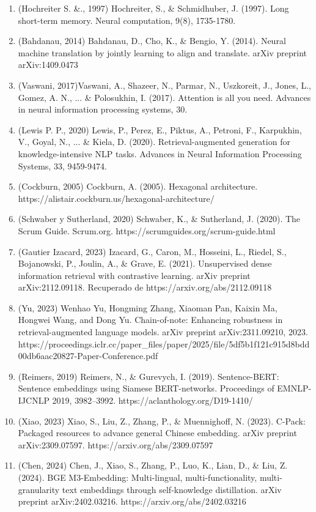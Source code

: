 \begin{enumerate}
\item (Hochreiter S. \&., 1997) Hochreiter, S., \& Schmidhuber, J. (1997). Long short-term memory. Neural computation, 9(8), 1735-1780.
\item (Bahdanau, 2014) Bahdanau, D., Cho, K., \& Bengio, Y. (2014). Neural machine translation by jointly learning to align and translate. arXiv preprint arXiv:1409.0473
\item (Vaswani, 2017)Vaswani, A., Shazeer, N., Parmar, N., Uszkoreit, J., Jones, L., Gomez, A. N., ... \& Polosukhin, I. (2017). Attention is all you need. Advances in neural information processing systems, 30.
\item (Lewis P. P., 2020) Lewis, P., Perez, E., Piktus, A., Petroni, F., Karpukhin, V., Goyal, N., ... \& Kiela, D. (2020). Retrieval-augmented generation for knowledge-intensive NLP tasks. Advances in Neural Information Processing Systems, 33, 9459-9474.
\item (Cockburn, 2005) Cockburn, A. (2005). Hexagonal architecture. https://alistair.cockburn.us/hexagonal-architecture/
\item (Schwaber y Sutherland, 2020) Schwaber, K., \& Sutherland, J. (2020). The Scrum Guide. Scrum.org. https://scrumguides.org/scrum-guide.html
\item (Gautier Izacard, 2023) Izacard, G., Caron, M., Hosseini, L., Riedel, S., Bojanowski, P., Joulin, A., \& Grave, E. (2021). Unsupervised dense information retrieval with contrastive learning. arXiv preprint arXiv:2112.09118. Recuperado de https://arxiv.org/abs/2112.09118
\item (Yu, 2023) Wenhao Yu, Hongming Zhang, Xiaoman Pan, Kaixin Ma, Hongwei Wang, and Dong Yu. Chain-of-note: Enhancing robustness in retrieval-augmented language models. arXiv preprint arXiv:2311.09210, 2023. https://proceedings.iclr.cc/paper\_files/paper/2025/file/5df5b1f121c915d8bdd00db6aac20827-Paper-Conference.pdf
\item (Reimers, 2019) Reimers, N., \& Gurevych, I. (2019). Sentence-BERT: Sentence embeddings using Siamese BERT-networks. Proceedings of EMNLP-IJCNLP 2019, 3982--3992. https://aclanthology.org/D19-1410/
\item (Xiao, 2023) Xiao, S., Liu, Z., Zhang, P., \& Muennighoff, N. (2023). C-Pack: Packaged resources to advance general Chinese embedding. arXiv preprint arXiv:2309.07597. https://arxiv.org/abs/2309.07597
\item (Chen, 2024) Chen, J., Xiao, S., Zhang, P., Luo, K., Lian, D., \& Liu, Z. (2024). BGE M3-Embedding: Multi-lingual, multi-functionality, multi-granularity text embeddings through self-knowledge distillation. arXiv preprint arXiv:2402.03216. https://arxiv.org/abs/2402.03216

\end{enumerate}
